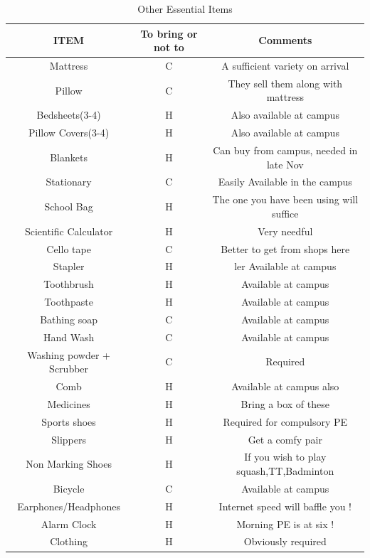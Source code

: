 \documentclass[11pt]{article}
\begin{document}
\begin{table}[H]
\centering
\begin{tabular}{ | c | c | c |}
\hline
 \textbf{ITEM} & \textbf{To bring or not to} & \textbf{Comments} \\ 
 \hline
 \index{Mattress}
 Mattress & C & A sufficient variety on arrival \\
 \hline
 \index{Pillow}  
 Pillow & C & They sell them along with mattress \\
 \hline	
 \index{Bedsheets}
 Bedsheets(3-4) & H & Also available at campus \\
 \hline
 \index{Pillow Cover}
 Pillow Covers(3-4) & H & Also available at campus \\
 \hline
 \index{Blankets}
 Blankets & H & Can buy from campus, needed in late Nov \\
 \hline
 \index{Stationary}
 Stationary & C  & Easily Available in the campus \\ 
 \hline   
 \index{School Bag}
 School Bag & H & The one you have been using will suffice \\
 \hline
 \index{Calculator}
 Scientific Calculator & H & Very needful \\
 \hline
 \index{Cello tape}
 Cello tape & C & Better to get from shops here \\
 \hline
 \index{Stap}
 Stapler & H &ler Available at campus \\
 \hline
 \index{Toothbrush}
 Toothbrush & H & Available at campus \\
 \hline
 \index{Toothpaste}
 Toothpaste & H & Available at campus \\
 \hline
 \index{Bathing Soap}
 Bathing soap & C & Available at campus \\
 \hline
 \index{Hand Wash}
 Hand Wash & C & Available at campus \\
 \hline
 \index{Scrubber}
 Washing powder + Scrubber & C & Required \\
 \hline
 Comb & H & Available at campus also \\
 \hline
 \index{Medicines}
 Medicines & H & Bring a box of these \\
 \hline
 Sports shoes & H & Required for compulsory PE \\
 \hline
 Slippers & H & Get a comfy pair \\
 \hline
 Non Marking Shoes & H & If you wish to play squash,TT,Badminton \\
 \hline
 \index{Bicycle}
 Bicycle & C & Available at campus \\
 \hline
 Earphones/Headphones & H & Internet speed will baffle you ! \\
 \hline
 Alarm Clock & H & Morning PE is at six ! \\
 \hline
 \index{Clothing}
 Clothing & H & Obviously required \\
 \hline
\end{tabular}
\caption{Other Essential Items}
\label{table:2}
\end{table}
\end{document}

